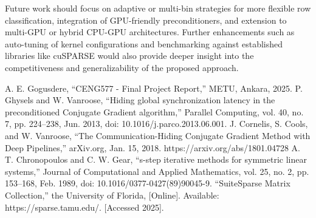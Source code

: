 \documentclass[conference]{IEEEtran}
\begin{document}
Future work should focus on adaptive or multi-bin strategies for more flexible row classification, integration of GPU-friendly preconditioners, and extension to multi-GPU or hybrid CPU-GPU architectures. Further enhancements such as auto-tuning of kernel configurations and benchmarking against established libraries like cuSPARSE would also provide deeper insight into the competitiveness and generalizability of the proposed approach.



\begin{thebibliography}{00}
 A. E. Gogusdere, “CENG577 - Final Project Report,” METU, Ankara, 2025.
 P. Ghysels and W. Vanroose, “Hiding global synchronization latency in the preconditioned Conjugate Gradient algorithm,” Parallel Computing, vol. 40, no. 7, pp. 224–238, Jun. 2013, doi: 10.1016/j.parco.2013.06.001.
 J. Cornelis, S. Cools, and W. Vanroose, “The Communication-Hiding Conjugate Gradient Method with Deep Pipelines,” arXiv.org, Jan. 15, 2018. https://arxiv.org/abs/1801.04728
 A. T. Chronopoulos and C. W. Gear, “s-step iterative methods for symmetric linear systems,” Journal of Computational and Applied Mathematics, vol. 25, no. 2, pp. 153–168, Feb. 1989, doi: 10.1016/0377-0427(89)90045-9.
 “SuiteSparse Matrix Collection,” the University of Florida, [Online]. Available: https://sparse.tamu.edu/. [Accessed 2025].

\end{thebibliography}
\end{document}
